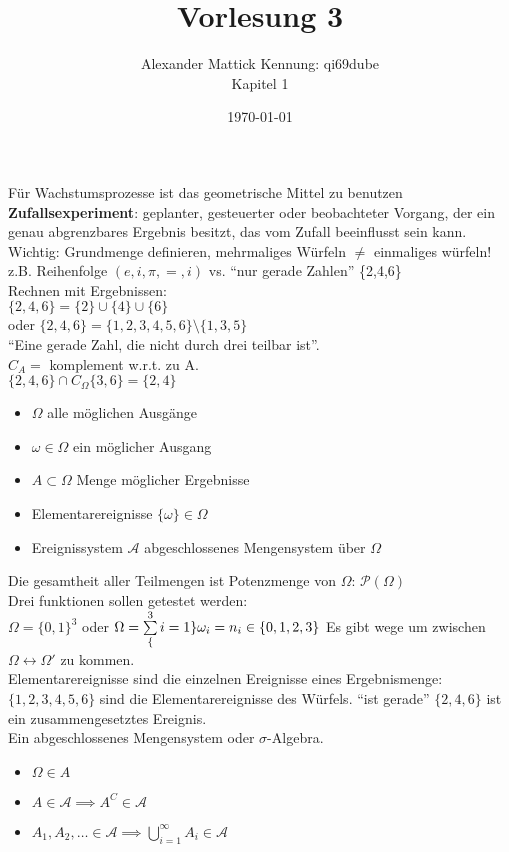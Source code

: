 \documentclass{article}
\author{
Alexander Mattick Kennung: qi69dube\\
Kapitel 1
}
\date{\today}
\title{Vorlesung 3}
\begin{document}
	\maketitle
	Für Wachstumsprozesse ist das geometrische Mittel zu benutzen
	\textbf{Zufallsexperiment}: geplanter, gesteuerter oder beobachteter Vorgang, der ein genau abgrenzbares Ergebnis besitzt, das vom Zufall beeinflusst sein kann.\\
	Wichtig: Grundmenge definieren, mehrmaliges Würfeln $\neq$ einmaliges würfeln!\\
	z.B. Reihenfolge $(e,i,\pi,=,i)$ vs. ``nur gerade Zahlen'' \{2,4,6\}\\
	Rechnen mit Ergebnissen:\\
	$\{2,4,6\}=\{2\}\cup\{4\}\cup\{6\}$\\
	oder $\{2,4,6\}=\{1,2,3,4,5,6\}\setminus \{1,3,5\}$\\
	``Eine gerade Zahl, die nicht durch drei teilbar ist''.\\
	$C_A=$ komplement w.r.t. zu A.\\
	$\{2,4,6\}\cap C_\Omega \{3,6\}=\{2,4\}$
	\begin{itemize}
		\item $\Omega$ alle möglichen Ausgänge
		\item $\omega\in \Omega$ ein möglicher Ausgang
		\item $A\subset \Omega$ Menge möglicher Ergebnisse
		\item Elementarereignisse $\{\omega\}\in \Omega$
		\item Ereignissystem $\mathscr{A}$ abgeschlossenes Mengensystem über $\Omega$
	\end{itemize}
	Die gesamtheit aller Teilmengen ist Potenzmenge von $\Omega$: $\mathscr{P}(\Omega)$\\
	Drei funktionen sollen getestet werden:\\
	$\Omega = \{0,1\}^3$ oder $\Omega\tabularnewline
	=\sum\limits^3_\{i=1\}\omega_i = n_i\in\{0,1,2,3\}$
	Es gibt wege um zwischen $\Omega \leftrightarrow \Omega'$ zu kommen.\\
	Elementarereignisse sind die einzelnen Ereignisse eines Ergebnismenge: $\{1,2,3,4,5,6\}$ sind die Elementarereignisse des Würfels. ``ist gerade'' $\{2,4,6\}$ ist ein zusammengesetztes Ereignis.\\
	Ein abgeschlossenes Mengensystem oder $\sigma$-Algebra.\\
	\begin{itemize}
		\item $\Omega\in A$
		\item $A\in\mathscr{A}\implies A^C\in \mathscr{A}$
		\item $A_1,A_2,\dots \in \mathscr{A}\implies \bigcup^\infty_{i=1} A_i\in\mathscr{A}$
	\end{itemize}
\end{document}
